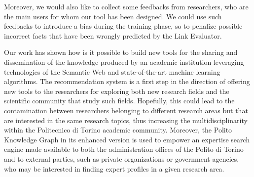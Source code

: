 \documentclass[%
    corpo=13.5pt,
    twoside,
    oldstyle,
    tipotesi=magistrale,
    greek,
    evenboxes
]{toptesi}
\begin{document}
Moreover, we would also like to collect some feedbacks from researchers,
who are the main users for whom our tool has been designed.
We could use such feedbacks to introduce a bias during the training phase, so
to penalize possible incorrect facts that have been wrongly predicted by the
Link Evaluator.

Our work has shown how is it possible to build new tools for the
sharing and dissemination of the knowledge produced by an academic institution
leveraging technologies of the Semantic Web and state-of-the-art machine
learning algorithms.
The recommendation system is a first step in the direction of
offering new tools to the researchers for exploring both new research fields
and the scientific community that study such fields.
Hopefully, this could lead to the contamination between researchers belonging
to different research areas but that are interested in the same research
topics, thus increasing the multidisciplinarity within the Politecnico di
Torino academic community.
Moreover, the Polito Knowledge Graph in its enhanced version is used to empower
an expertise search engine made available to both the administration offices
of the Polito di Torino and to external parties, such as private organizations
or government agencies, who may be interested in finding expert profiles in a
given research area.




\end{document}
